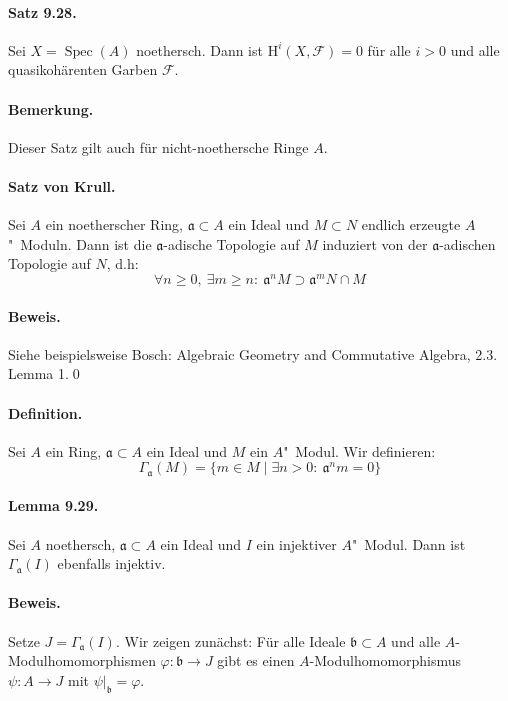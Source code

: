 \paragraph{Satz 9.28.}\label{9.28} Sei $X=\operatorname{Spec}(A)$ noethersch. Dann ist $\mathrm{H}^i(X,\mathcal{F})=0$ für alle $i>0$ und alle quasikohärenten Garben $\mathcal{F}$.

\paragraph{Bemerkung.} Dieser Satz gilt auch für nicht-noethersche Ringe $A$.

\paragraph{Satz von Krull.}\label{prop:krull} Sei $A$ ein noetherscher Ring, $\mathfrak{a}\subset A$ ein Ideal und $M\subset N$ endlich erzeugte $A$"~Moduln. Dann ist die $\mathfrak{a}$-adische Topologie auf $M$ induziert von der $\mathfrak{a}$-adischen Topologie auf $N$, d.h:
\[\forall n\geq 0,\ \exists m\geq n:\ \mathfrak{a}^nM\supset\mathfrak{a}^mN\cap M \]

\paragraph{Beweis.} Siehe beispielsweise Bosch: Algebraic Geometry and Commutative Algebra, 2.3. Lemma 1.\qed

\paragraph{Definition.} Sei $A$ ein Ring, $\mathfrak{a}\subset A$ ein Ideal und $M$ ein $A$"~Modul. Wir definieren:
\[\Gamma_\mathfrak{a}(M)=\{m\in M\mid\exists n>0:\ \mathfrak{a}^nm=0 \} \]

\paragraph{Lemma 9.29.}\label{9.29} Sei $A$ noethersch, $\mathfrak{a}\subset A$ ein Ideal und $I$ ein injektiver $A$"~Modul. Dann ist $\Gamma_\mathfrak{a}(I)$ ebenfalls injektiv.

\paragraph{Beweis.} Setze $J=\Gamma_\mathfrak{a}(I)$. Wir zeigen zunächst: Für alle Ideale $\mathfrak{b}\subset A$ und alle $A$-Modulhomomorphismen $\varphi:\mathfrak{b}\to J$ gibt es einen $A$-Modulhomomorphismus $\psi:A\to J$ mit $\psi|_\mathfrak{b}=\varphi$.

